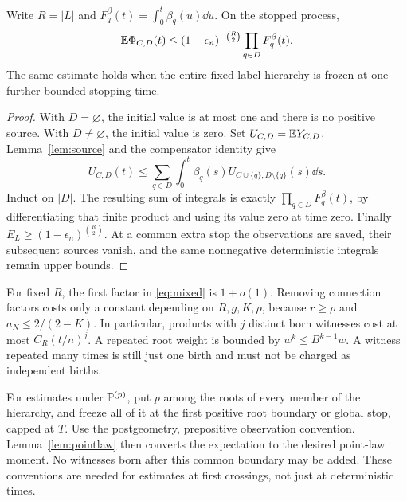 \begin{proposition}\label{prop:mixed}
Write \(R=|L|\) and \(F_q^\beta(t)=\int_0^t\beta_q(u)\dd u\).
On the stopped process,
\begin{equation}\label{eq:mixed}
 \mathbb E\Phi_{C,D}(t)\le
 (1-\epsilon_n)^{-\binom R2}\prod_{q\in D}F_q^\beta(t).
\end{equation}
The same estimate holds when the entire fixed-label hierarchy is
frozen at one further bounded stopping time.
\end{proposition}
\begin{proof}
With \(D=\varnothing\), the initial value is at most one and there
is no positive source. With \(D\ne\varnothing\), the initial value
is zero. Set \(U_{C,D}=\mathbb E Y_{C,D}\). Lemma~\ref{lem:source} and the
compensator identity give
\[
 U_{C,D}(t)\le\sum_{q\in D}\int_0^t
 \beta_q(s)U_{C\cup\{q\},D\setminus\{q\}}(s)\dd s.
\]
Induct on \(|D|\). The resulting sum of integrals is exactly
\(\prod_{q\in D}F_q^\beta(t)\), by differentiating that finite
product and using its value zero at time zero. Finally
\(E_L\ge(1-\epsilon_n)^{\binom R2}\). At a common extra stop the
observations are saved, their subsequent sources vanish, and the
same nonnegative deterministic integrals remain upper bounds.
\end{proof}

For fixed \(R\), the first factor in \eqref{eq:mixed} is \(1+o(1)\).
Removing connection factors costs only a constant depending on
\(R,g,K,\rho\), because \(r\ge\rho\) and \(a_N\le2/(2-K)\).
In particular, products with \(j\) distinct born witnesses cost
at most \(C_R(t/n)^j\). A repeated root weight is bounded by
\(w^k\le B^{k-1}w\). A witness repeated many times is still just one
birth and must not be charged as independent births.

For estimates under \(\mathbb P^{(p)}\), put \(p\) among the roots of
every member of the hierarchy, and freeze all of it at the first
positive root boundary or global stop, capped at \(T\). Use the
postgeometry, prepositive observation convention. Lemma~\ref{lem:pointlaw}
then converts the expectation to the desired point-law moment.
No witnesses born after this common boundary may be added.
These conventions are needed for estimates at first crossings,
not just at deterministic times.

